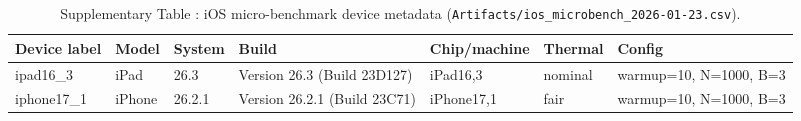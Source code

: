 \begin{table}[!tp]
\centering
\caption{Supplementary Table \thetable: iOS micro-benchmark device metadata (\texttt{Artifacts/ios\_microbench\_2026-01-23.csv}).}
\label{tab:supp-ios-microbench-devices}
\begin{tabular}{@{}lllllll@{}}
\toprule
Device label & Model & System & Build & Chip/machine & Thermal & Config \\
\midrule
ipad16\_3 & iPad & 26.3 & Version 26.3 (Build 23D127) & iPad16,3 & nominal & warmup=10, N=1000, B=3 \\
iphone17\_1 & iPhone & 26.2.1 & Version 26.2.1 (Build 23C71) & iPhone17,1 & fair & warmup=10, N=1000, B=3 \\
\bottomrule
\end{tabular}
\end{table}

